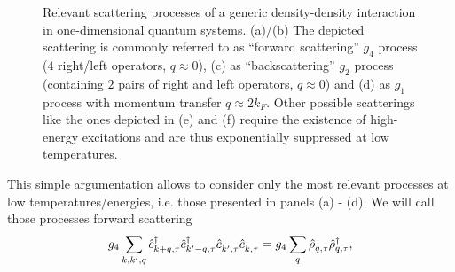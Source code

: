 \begin{figure}
    \caption{Relevant scattering processes of a generic density-density interaction in one-dimensional quantum systems. (a)/(b) The depicted scattering is commonly referred to as ``forward scattering'' $g_4$ process ($4$ right/left operators, $q\approx0$), (c) as ``backscattering'' $g_2$ process (containing $2$ pairs of right and left operators, $q\approx0$) and (d) as $g_1$ process with momentum transfer $q\approx 2k_F$. Other possible scatterings like the ones depicted in (e) and (f) require the existence of high-energy excitations and are thus exponentially suppressed at low temperatures.}
    \label{fig:scattering_processes}
\end{figure}
This simple argumentation allows to consider only the most relevant processes at low temperatures/energies, i.e. those presented in panels (a) - (d).
We will call those processes forward scattering
\begin{align}
    g_4\sum_{k,k',q}\hat c^\dag_{k+q,\tau}\hat c^\dag_{k'-q,\tau}\hat c^\pdag_{k',\tau}\hat c^\pdag_{k,\tau} = g_4 \sum_q\hat\rho^\pdag_{q,\tau}\hat\rho^\dag_{q,\tau},
\end{align}
